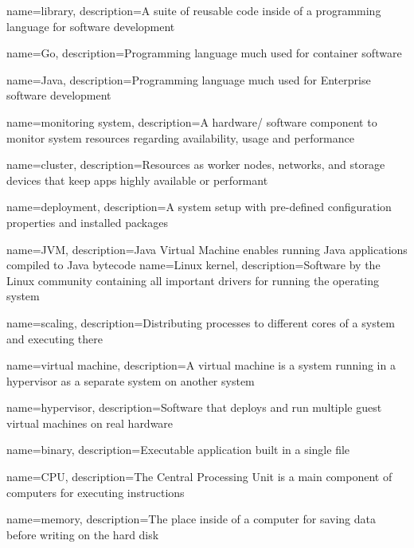 {
    name={library},
    description={A suite of reusable code inside of a programming language for software development}
}

{
    name={Go},
    description={Programming language much used for container software}
}

{
    name={Java},
    description={Programming language much used for Enterprise software development}
}

{
    name={monitoring system},
    description={A hardware/ software component to monitor system resources regarding availability, usage and performance}
}

{
    name={cluster},
    description={Resources as worker nodes, networks, and storage devices that keep apps highly available or performant}
}

{
    name={deployment},
    description={A system setup with pre-defined configuration properties and installed packages}
}

{
    name={JVM},
    description={Java Virtual Machine enables running Java applications compiled to Java bytecode}
}
{
    name={Linux kernel},
    description={Software by the Linux community containing all important drivers for running the operating system}
}

{
    name={scaling},
    description={Distributing processes to different cores of a system and executing there}
}

{
    name={virtual machine},
    description={A virtual machine is a system running in a hypervisor as a separate system on another system}
}

{
    name={hypervisor},
    description={Software that deploys and run multiple guest virtual machines on real hardware}
}


{
    name={binary},
    description={Executable application built in a single file}
}

{
    name={CPU},
    description={The Central Processing Unit is a main component of computers for executing instructions}
}

{
    name={memory},
    description={The place inside of a computer for saving data before writing on the hard disk}
}

